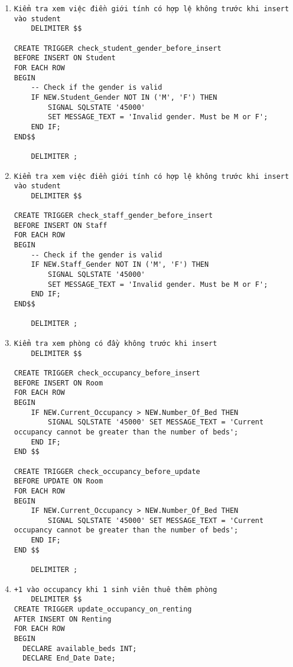 \documentclass[a4paper,12pt]{article}
\begin{document}
\begin{enumerate}
    \item \begin{verbatim}
Kiểm tra xem việc điền giới tính có hợp lệ không trước khi insert vào student
    DELIMITER $$

CREATE TRIGGER check_student_gender_before_insert
BEFORE INSERT ON Student
FOR EACH ROW
BEGIN
    -- Check if the gender is valid
    IF NEW.Student_Gender NOT IN ('M', 'F') THEN
        SIGNAL SQLSTATE '45000'
        SET MESSAGE_TEXT = 'Invalid gender. Must be M or F';
    END IF;
END$$

    DELIMITER ;
    \end{verbatim}
    \item \begin{verbatim}
Kiểm tra xem việc điền giới tính có hợp lệ không trước khi insert vào student
    DELIMITER $$

CREATE TRIGGER check_staff_gender_before_insert
BEFORE INSERT ON Staff
FOR EACH ROW
BEGIN
    -- Check if the gender is valid
    IF NEW.Staff_Gender NOT IN ('M', 'F') THEN
        SIGNAL SQLSTATE '45000'
        SET MESSAGE_TEXT = 'Invalid gender. Must be M or F';
    END IF;
END$$

    DELIMITER ;

    \end{verbatim}
    \item \begin{verbatim}
Kiểm tra xem phòng có đầy không trước khi insert
    DELIMITER $$

CREATE TRIGGER check_occupancy_before_insert
BEFORE INSERT ON Room
FOR EACH ROW
BEGIN
    IF NEW.Current_Occupancy > NEW.Number_Of_Bed THEN
        SIGNAL SQLSTATE '45000' SET MESSAGE_TEXT = 'Current occupancy cannot be greater than the number of beds';
    END IF;
END $$

CREATE TRIGGER check_occupancy_before_update
BEFORE UPDATE ON Room
FOR EACH ROW
BEGIN
    IF NEW.Current_Occupancy > NEW.Number_Of_Bed THEN
        SIGNAL SQLSTATE '45000' SET MESSAGE_TEXT = 'Current occupancy cannot be greater than the number of beds';
    END IF;
END $$

    DELIMITER ;
    \end{verbatim}
    \item \begin{verbatim}
+1 vào occupancy khi 1 sinh viên thuê thêm phòng
    DELIMITER $$
CREATE TRIGGER update_occupancy_on_renting
AFTER INSERT ON Renting
FOR EACH ROW
BEGIN
  DECLARE available_beds INT;
  DECLARE End_Date Date;


\end{verbatim}
\end{enumerate}
\end{document}
